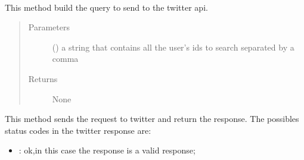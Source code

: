\documentclass[letterpaper,10pt,english]{sphinxmanual}
\begin{document}
\begin{fulllineitems}
\label{\detokenize{code_comment/user_search:hate_tweet_map.users_searcher.SearchUsers.UserSearch}}~

\begin{fulllineitems}
\label{\detokenize{code_comment/user_search:hate_tweet_map.users_searcher.SearchUsers.UserSearch.__build_query}}
\sphinxAtStartPar
This method build the query to send to the twitter api.
\begin{quote}\begin{description}
\item[{Parameters}] \leavevmode
\sphinxAtStartPar
{} () \textendash{} a string that contains all the user’s ids to search separated by a comma

\item[{Returns}] \leavevmode
\sphinxAtStartPar
None

\end{description}\end{quote}

\end{fulllineitems}


\begin{fulllineitems}
\label{\detokenize{code_comment/user_search:hate_tweet_map.users_searcher.SearchUsers.UserSearch.__connect_to_endpoint}}
\sphinxAtStartPar
This method sends the request to twitter and return the response.
The possibles status codes in the twitter response are:
\begin{itemize}
\item {} 
: ok,in this case the response is a valid response;


\end{itemize}
\end{fulllineitems}
\end{fulllineitems}
\end{document}
